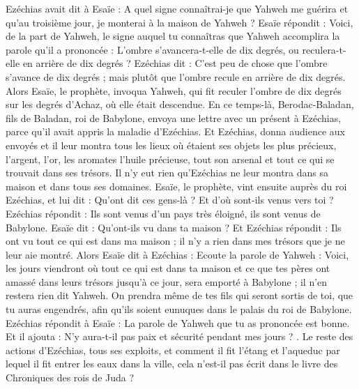 \begin{multicols}{2}
Ezéchias avait dit à Esaïe : A quel signe connaîtrai-je que Yahweh me guérira et qu'au troisième jour, je monterai à la maison de Yahweh ?
Esaïe répondit : Voici, de la part de Yahweh, le signe auquel tu connaîtras que Yahweh accomplira la parole qu'il a prononcée : L'ombre s'avancera-t-elle de dix degrés, ou reculera-t-elle en arrière de dix degrés ?
Ezéchias dit : C'est peu de chose que l'ombre s'avance de dix degrés ; mais plutôt que l'ombre recule en arrière de dix degrés.
Alors Esaïe, le prophète, invoqua Yahweh, qui fit reculer l'ombre de dix degrés sur les degrés d'Achaz, où elle était descendue.
En ce temps-là, Berodac-Baladan, fils de Baladan, roi de Babylone, envoya une lettre avec un présent à Ezéchias, parce qu'il avait appris la maladie d'Ezéchias.
Et Ezéchias, donna audience aux envoyés et il leur montra tous les lieux où étaient ses objets les plus précieux, l'argent, l'or, les aromates l'huile précieuse, tout son arsenal et tout ce qui se trouvait dans ses trésors. Il n'y eut rien qu'Ezéchias ne leur montra dans sa maison et dans tous ses domaines.
Esaïe, le prophète, vint ensuite auprès du roi Ezéchias, et lui dit : Qu'ont dit ces gens-là ? Et d'où sont-ils venus vers toi ? Ezéchias répondit : Ils sont venus d'un pays très éloigné, ils sont venus de Babylone.
Esaïe dit : Qu'ont-ils vu dans ta maison ? Et Ezéchias répondit : Ils ont vu tout ce qui est dans ma maison ; il n'y a rien dans mes trésors que je ne leur aie montré.
Alors Esaïe dit à Ezéchias : Ecoute la parole de Yahweh :
Voici, les jours viendront où tout ce qui est dans ta maison et ce que tes pères ont amassé dans leurs trésors jusqu'à ce jour, sera emporté à Babylone ; il n'en restera rien dit Yahweh.
On prendra même de tes fils qui seront sortis de toi, que tu auras engendrés, afin qu'ils soient eunuques dans le palais du roi de Babylone.
Ezéchias répondit à Esaïe : La parole de Yahweh que tu as prononcée est bonne. Et il ajouta : N'y aura-t-il pas paix et sécurité pendant mes jours ?
.
Le reste des actions d'Ezéchias, tous ses exploits, et comment il fit l'étang et l'aqueduc par lequel il fit entrer les eaux dans la ville, cela n'est-il pas écrit dans le livre des Chroniques des rois de Juda ?

\end{multicols}
